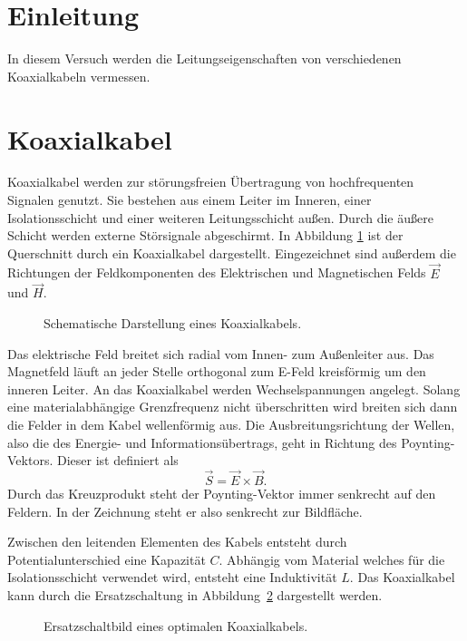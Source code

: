 \section{Einleitung}
%
In diesem Versuch werden die Leitungseigenschaften von verschiedenen Koaxialkabeln vermessen.


\section{Koaxialkabel}
\label{sec:koax}
Koaxialkabel werden zur störungsfreien Übertragung von hochfrequenten Signalen genutzt.
Sie bestehen aus einem Leiter im Inneren, einer Isolationsschicht und einer weiteren Leitungsschicht außen.
Durch die äußere Schicht werden externe Störsignale abgeschirmt.
In Abbildung \ref{fig:koax} ist der Querschnitt durch ein Koaxialkabel dargestellt.
Eingezeichnet sind außerdem die Richtungen der Feldkomponenten des Elektrischen und Magnetischen Felds $\vec{E}$ und $\vec{H}$.
\begin{figure}
  \centering
  
  \caption{Schematische Darstellung eines Koaxialkabels.}
  \label{fig:koax}
\end{figure}

Das elektrische Feld breitet sich radial vom Innen- zum Außenleiter aus.
Das Magnetfeld läuft an jeder Stelle orthogonal zum E-Feld kreisförmig um den inneren Leiter.
An das Koaxialkabel werden Wechselspannungen angelegt.
Solang eine materialabhängige Grenzfrequenz nicht überschritten wird breiten sich dann die Felder in dem Kabel
wellenförmig aus.
Die Ausbreitungsrichtung der Wellen, also die des Energie- und Informationsübertrags, geht in Richtung des Poynting-Vektors.
Dieser ist definiert als
\begin{equation}
  \label{eq:poynting}
  \vec{S} = \vec{E} \times \vec{B}.
\end{equation}
Durch das Kreuzprodukt steht der Poynting-Vektor immer senkrecht auf den Feldern. In der Zeichnung steht er also senkrecht
zur Bildfläche.

Zwischen den leitenden Elementen des Kabels entsteht durch Potentialunterschied eine Kapazität $C$.
Abhängig vom Material welches für die Isolationsschicht verwendet wird, entsteht eine Induktivität $L$.
Das Koaxialkabel kann durch die Ersatzschaltung in Abbildung~\ref{fig:circuit} dargestellt werden.
\begin{figure}
  \centering
  
  \caption{Ersatzschaltbild eines optimalen Koaxialkabels.}
  \label{fig:circuit}
\end{figure}

